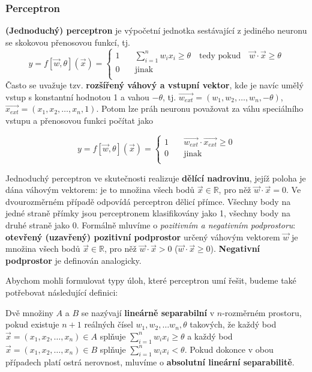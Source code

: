 \documentclass[11pt]{report} %
\newcommand{\R}{\mathbb{R}}
\begin{document}
\subsubsection{Perceptron}
\textbf{(Jednoduchý) perceptron} je výpočetní jednotka sestávající z jediného neuronu se skokovou přenosovou funkcí, tj.
\[
y = f[\vec{w},\theta](\vec{x}) = 
\begin{cases}
1 	& \quad \sum\limits_{i=1}^n w_i x_i \geq \theta \quad \text{tedy pokud} \quad \vec{w}\cdot\vec{x} \geq \theta\\
0 	& \quad \text{jinak}\\
\end{cases}
\]
Často se uvažuje tzv. \textbf{rozšířený váhový a vstupní vektor}, kde je navíc umělý vstup s konstantní hodnotou 1 a vahou $-\theta$, tj. $\overrightarrow{w_{ext}} = (w_1, w_2, \dots, w_n, -\theta)$, $\overrightarrow{x_{ext}} = (x_1, x_2, \dots, x_n, 1)$. Potom lze práh neuronu považovat za váhu speciálního vstupu a přenosovou funkci počítat jako 

\[
y = f[\vec{w},\theta](\vec{x}) = 
\begin{cases}
1 	& \quad \overrightarrow{w_{ext}}\cdot\overrightarrow{x_{ext}} \geq 0\\
0 	& \quad \text{jinak}\\
\end{cases}
\]

Jednoduchý perceptron ve skutečnosti realizuje \textbf{dělící nadrovinu}, jejíž poloha je dána váhovým vektorem: je to množina všech bodů $\vec{x} \in \R$, pro něž $\vec{w}\cdot\vec{x} = 0$. Ve dvourozměrném případě odpovídá perceptron dělicí přímce. Všechny body na jedné straně přímky jsou perceptronem klasifikovány jako 1, všechny body na druhé straně jako 0. Formálně mluvíme o \textit{pozitivním a negativním podprostoru}: \textbf{otevřený (uzavřený) pozitivní podprostor} určený váhovým vektorem $\vec{w}$ je množina všech bodů $\vec{x} \in \R$, pro něž $\vec{w}\cdot\vec{x} > 0$ ($\vec{w}\cdot\vec{x} \geq 0$). \textbf{Negativní podprostor} je definován analogicky.

Abychom mohli formulovat typy úloh, které perceptron umí řešit, budeme také potřebovat následující definici:

Dvě množiny $A$ a $B$ se nazývají \textbf{lineárně separabilní} v $n$-rozměrném prostoru, pokud existuje $n+1$ reálných čísel $w_1, w_2, \dots w_n, \theta$ takových, že každý bod $\vec{x} = (x_1, x_2, \dots, x_n) \in A$ splňuje $\sum\limits_{i=1}^n w_i x_i \geq \theta$ a každý bod $\vec{x} = (x_1, x_2, \dots, x_n) \in B$ splňuje $\sum\limits_{i=1}^n w_i x_i < \theta$. Pokud dokonce v obou případech platí ostrá nerovnost, mluvíme o \textbf{absolutní lineární separabilitě}. 
\end{document}
